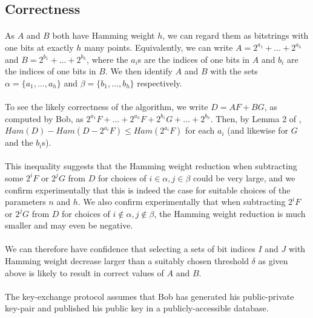 \subsection{Correctness}
\paragraph{}
As $A$ and $B$ both have Hamming weight $h$, we can regard them as bitstrings with one bits at exactly $h$ many points. Equivalently, we can write $A = 2^{a_1} + \dots + 2^{a_h}$ and $B = 2^{b_1} + \dots + 2^{b_h}$, where the $a_i$s are the indices of one bits in $A$ and $b_i$ are the indices of one bits in $B$. We then identify $A$ and $B$ with the sets $\alpha = \{ a_1, \dots, a_h \}$ and $\beta = \{ b_1, \dots, b_h \}$ respectively.

\paragraph{}
To see the likely correctness of the algorithm, we write $D = AF + BG$, as computed by Bob, as $2^{a_1} F + \dots + 2^{a_h} F + 2^{b_1} G + \dots + 2^{b_h}$. Then, by Lemma 2 of \cite{aggarwal2018new}, $Ham(D) - Ham(D - 2^{a_i} F) \leq Ham(2^{a_i} F)$ for each $a_i$ (and likewise for $G$ and the $b_i$s).

\paragraph{}
This inequality suggests that the Hamming weight reduction when subtracting some $2^i F$ or $2^j G$ from $D$ for choices of $i \in \alpha, j \in \beta$ could be very large, and we confirm experimentally that this is indeed the case for suitable choices of the parameters $n$ and $h$. We also confirm experimentally that when subtracting $2^i F$ or $2^j G$ from $D$ for choices of $i \not\in \alpha, j \not \in \beta$, the Hamming weight reduction is much smaller and may even be negative.

\paragraph{}
We can therefore have confidence that selecting a sets of bit indices $I$ and $J$ with Hamming weight decrease larger than a suitably chosen threshold $\delta$ as given above is likely to result in correct values of $A$ and $B$.

\paragraph{}
The key-exchange protocol assumes that Bob has generated his public-private key-pair and published his public key in a publicly-accessible database.

